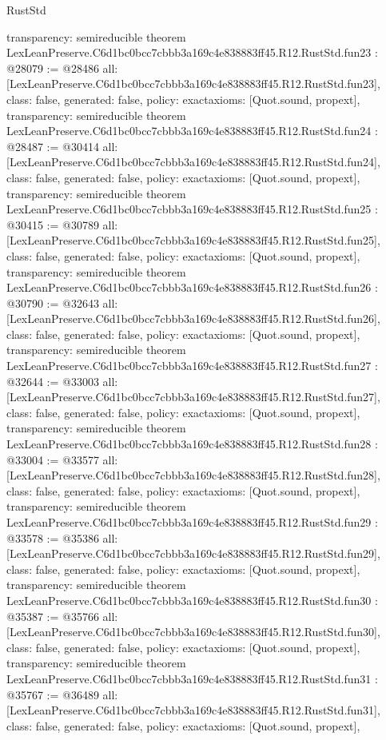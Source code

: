\begin{lexlean}{RustStd}
\begin{coremodule}
{  transparency: semireducible
}
theorem LexLeanPreserve.C6d1bc0bcc7cbbb3a169c4e838883ff45.R12.RustStd.fun23 : @28079 := @28486 {
  all: [LexLeanPreserve.C6d1bc0bcc7cbbb3a169c4e838883ff45.R12.RustStd.fun23],
  class: false,
  generated: false,
  policy: exact{axioms: [Quot.sound, propext]},
  transparency: semireducible
}
theorem LexLeanPreserve.C6d1bc0bcc7cbbb3a169c4e838883ff45.R12.RustStd.fun24 : @28487 := @30414 {
  all: [LexLeanPreserve.C6d1bc0bcc7cbbb3a169c4e838883ff45.R12.RustStd.fun24],
  class: false,
  generated: false,
  policy: exact{axioms: [Quot.sound, propext]},
  transparency: semireducible
}
theorem LexLeanPreserve.C6d1bc0bcc7cbbb3a169c4e838883ff45.R12.RustStd.fun25 : @30415 := @30789 {
  all: [LexLeanPreserve.C6d1bc0bcc7cbbb3a169c4e838883ff45.R12.RustStd.fun25],
  class: false,
  generated: false,
  policy: exact{axioms: [Quot.sound, propext]},
  transparency: semireducible
}
theorem LexLeanPreserve.C6d1bc0bcc7cbbb3a169c4e838883ff45.R12.RustStd.fun26 : @30790 := @32643 {
  all: [LexLeanPreserve.C6d1bc0bcc7cbbb3a169c4e838883ff45.R12.RustStd.fun26],
  class: false,
  generated: false,
  policy: exact{axioms: [Quot.sound, propext]},
  transparency: semireducible
}
theorem LexLeanPreserve.C6d1bc0bcc7cbbb3a169c4e838883ff45.R12.RustStd.fun27 : @32644 := @33003 {
  all: [LexLeanPreserve.C6d1bc0bcc7cbbb3a169c4e838883ff45.R12.RustStd.fun27],
  class: false,
  generated: false,
  policy: exact{axioms: [Quot.sound, propext]},
  transparency: semireducible
}
theorem LexLeanPreserve.C6d1bc0bcc7cbbb3a169c4e838883ff45.R12.RustStd.fun28 : @33004 := @33577 {
  all: [LexLeanPreserve.C6d1bc0bcc7cbbb3a169c4e838883ff45.R12.RustStd.fun28],
  class: false,
  generated: false,
  policy: exact{axioms: [Quot.sound, propext]},
  transparency: semireducible
}
theorem LexLeanPreserve.C6d1bc0bcc7cbbb3a169c4e838883ff45.R12.RustStd.fun29 : @33578 := @35386 {
  all: [LexLeanPreserve.C6d1bc0bcc7cbbb3a169c4e838883ff45.R12.RustStd.fun29],
  class: false,
  generated: false,
  policy: exact{axioms: [Quot.sound, propext]},
  transparency: semireducible
}
theorem LexLeanPreserve.C6d1bc0bcc7cbbb3a169c4e838883ff45.R12.RustStd.fun30 : @35387 := @35766 {
  all: [LexLeanPreserve.C6d1bc0bcc7cbbb3a169c4e838883ff45.R12.RustStd.fun30],
  class: false,
  generated: false,
  policy: exact{axioms: [Quot.sound, propext]},
  transparency: semireducible
}
theorem LexLeanPreserve.C6d1bc0bcc7cbbb3a169c4e838883ff45.R12.RustStd.fun31 : @35767 := @36489 {
  all: [LexLeanPreserve.C6d1bc0bcc7cbbb3a169c4e838883ff45.R12.RustStd.fun31],
  class: false,
  generated: false,
  policy: exact{axioms: [Quot.sound, propext]},
}
\end{coremodule}
\end{lexlean}
